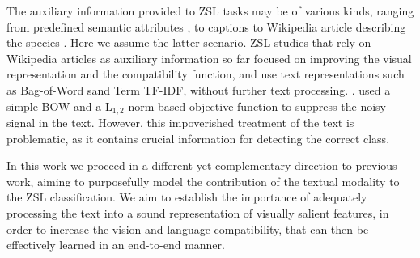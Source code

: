 \documentclass[11pt,a4paper]{article}
\begin{document}





The auxiliary information provided to ZSL tasks may be of various kinds, ranging from predefined semantic attributes \cite{lampert2009learning,changpinyo2020classifier,atzmon2018probabilistic}, to captions \cite{Xian_2018_CVPR,Sariyildiz_2019_CVPR} to Wikipedia article describing the species \cite{elhoseiny2017link}.
Here we assume the latter scenario. ZSL studies that rely on Wikipedia articles as auxiliary information so far focused on improving the visual representation and the compatibility function, and use text representations such as Bag-of-Word sand Term TF-IDF, without further text processing. \cite{lei2015predicting,elhoseiny2013write,elhoseiny2016write,elhoseiny2017link,zhu2018generative}. \citet{qiao2016less} used a simple BOW and a L$_{1,2}$-norm based objective function to suppress the noisy signal in the text. However, this impoverished treatment of the text is problematic, as it contains crucial information for detecting the correct class. 

In this work we proceed in a different yet complementary direction to previous work, aiming to purposefully model the contribution of the textual modality to the ZSL classification.
We aim to establish the importance of adequately processing the text into a sound representation of visually salient features, in order to increase the vision-and-language compatibility, that can then be effectively learned in an end-to-end manner.
\end{document}
